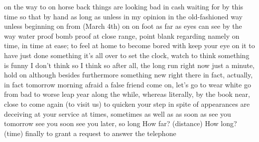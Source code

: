 
{on the way to}
{on horse back}
{things are looking bad}
{in cash}
{waiting for}
{by this time}
{so that}
{by hand}
{as long as}
{unless}
{in my opinion}
{in the old-fashioned way}
{unless}
{beginning on}
{from (March 4th) on}
{on foot}
{as far as eyes can see}
{by the way}
{water proof}
{bomb proof}
{at close range, point blank}
{regarding}
{namely}
{on time, in time}
{at ease; to feel at home}
{to become bored with}
{keep your eye on it}
{to have just done something}
{it’s all over}
{to set the clock, watch}
{to think something is funny}
{I don’t think so}
{I think so}
{after all, the long run}
{right now}
{just a minute, hold on}
{although}
{besides}
{furthermore}
{something new}
{right there}
{in fact, actually, in fact}
{tomorrow morning}
{afraid}
{a false friend}
{come on, let’s go}
{to wear white}
{go from bad to worse}
{leap year}
{along the}
{while, whereas}
{literally, by the book}
{near, close to}
{come again (to visit us)}
{to quicken your step}
{in spite of}
{appearances are deceiving}
{at your service}
{at times, sometimes}
{as well as}
{as soon as}
{see you tomorrow}
{see you soon}
{see you later, so long}
{How far? (distance)}
{How long? (time)}
{finally}
{to grant a request}
{to answer the telephone}

